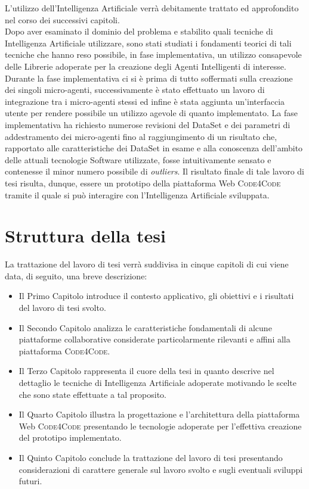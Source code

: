 L'utilizzo dell'Intelligenza Artificiale verrà debitamente trattato ed approfondito nel corso dei successivi capitoli.\\Dopo aver esaminato il dominio del problema e stabilito quali tecniche di Intelligenza Artificiale utilizzare, sono stati studiati i fondamenti teorici di tali tecniche che hanno reso possibile, in fase implementativa, un utilizzo consapevole delle Librerie adoperate per la creazione degli Agenti Intelligenti di interesse. Durante la fase implementativa ci si è prima di tutto soffermati sulla creazione dei singoli micro-agenti, successivamente è stato effettuato un lavoro di integrazione tra i micro-agenti stessi ed infine è stata aggiunta un'interfaccia utente per rendere possibile un utilizzo agevole di quanto implementato. La fase implementativa ha richiesto numerose revisioni del DataSet e dei parametri di addestramento dei micro-agenti fino al raggiungimento di un risultato che, rapportato alle caratteristiche dei DataSet in esame e alla conoscenza dell'ambito delle attuali tecnologie Software utilizzate, fosse intuitivamente sensato e contenesse il minor numero possibile di \emph{outliers}. Il risultato finale di tale lavoro di tesi risulta, dunque, essere un prototipo della piattaforma Web \textsc{Code4Code} tramite il quale si può interagire con l'Intelligenza Artificiale sviluppata.  
\section{Struttura della tesi}
La trattazione del lavoro di tesi verrà suddivisa in cinque capitoli di cui viene data, di seguito, una breve descrizione:
\begin{itemize}
    \item Il Primo Capitolo introduce il contesto applicativo, gli obiettivi e i risultati del lavoro di tesi svolto.
    \item Il Secondo Capitolo analizza le caratteristiche fondamentali di alcune piattaforme collaborative considerate particolarmente rilevanti e affini alla piattaforma \textsc{Code4Code}.
    \item Il Terzo Capitolo rappresenta il cuore della tesi in quanto descrive nel dettaglio le tecniche di Intelligenza Artificiale adoperate motivando le scelte che sono state effettuate a tal proposito.
    \item Il Quarto Capitolo illustra la progettazione e l'architettura della piattaforma Web \textsc{Code4Code} presentando le tecnologie adoperate per l'effettiva creazione del prototipo implementato.
    \item Il Quinto Capitolo conclude la trattazione del lavoro di tesi presentando considerazioni di carattere generale sul lavoro svolto e sugli eventuali sviluppi futuri.
\end{itemize}
